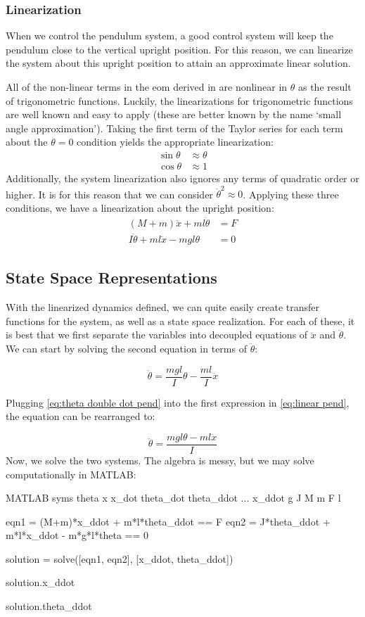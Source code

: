 \subsubsection{Linearization}
When we control the pendulum system, a good control system will keep the pendulum close to the vertical upright position. For this reason, we can linearize the system about this upright position to attain an approximate linear solution.

All of the non-linear terms in the \gls{eom} derived in  are nonlinear in $\theta$ as the result of trigonometric functions. Luckily, the linearizations for trigonometric functions are well known and easy to apply (these are better known by the name `small angle approximation'). Taking the first term of the Taylor series for each term about the $\theta=0$ condition yields the appropriate linearization:
\begin{align}
    \sin\theta&\approx\theta\\
    \cos\theta&\approx1
\end{align}
Additionally, the system linearization also ignores any terms of quadratic order or higher. It is for this reason that we can consider $\dot{\theta}^2\approx0$. Applying these three conditions, we have a linearization about the upright position:
\begin{align}\label{eq:linear pend}
     (M+m)\ddot{x}+ml\ddot{\theta}&=F \\I\ddot{\theta}+ml\ddot{x}-mgl\theta&=0
\end{align}
\subsection{State Space Representations}
With the linearized dynamics defined, we can quite easily create transfer functions for the system, as well as a state space realization. For each of these, it is best that we first separate the variables into decoupled equations of $\ddot{x}$ and $\ddot{\theta}$. We can start by solving the second equation in terms of $\ddot{\theta}$:

\begin{equation}\label{eq:theta double dot pend}
    \ddot{\theta}=\frac{mgl}{I}\theta-\frac{ml}{I}\ddot{x}
\end{equation}

Plugging \eqref{eq:theta double dot pend} into the first expression in \eqref{eq:linear pend}, the equation can be rearranged to:

$$\ddot{\theta}=\frac{mgl\theta-ml\ddot{x}}{I}$$
Now, we solve the two systems. The algebra is messy, but we may solve computationally in MATLAB:
\begin{matlabscript}{MATLAB}{}
syms theta x x_dot theta_dot theta_ddot ...
x_ddot g J M m F l

eqn1 = (M+m)*x_ddot + m*l*theta_ddot == F
eqn2 = J*theta_ddot + m*l*x_ddot - m*g*l*theta == 0

solution = solve([eqn1, eqn2], [x_ddot, theta_ddot])

solution.x_ddot

solution.theta_ddot
\end{matlabscript}

